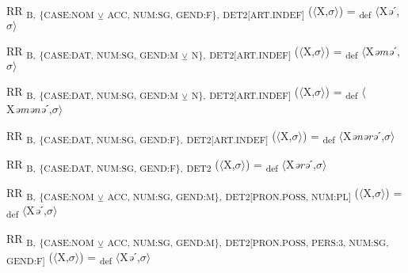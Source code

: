 {\begin{exe}
 RR \textsubscript{B,} \textsubscript{\{CASE:NOM} \textsubscript{${\veebar}$}\textsubscript{ ACC, NUM:SG, GEND:F\},} \textsubscript{DET2[ART.INDEF]} ($\langle$X,$\sigma $$\rangle$) = \textsubscript{def} $\langle$X\textit{ə}ˊ,$\sigma $$\rangle$
\end{exe}

\begin{exe}
 RR \textsubscript{B,} \textsubscript{\{CASE:DAT, NUM:SG, GEND:M} \textsubscript{${\veebar}$}\textsubscript{ N\},} \textsubscript{DET2[ART.INDEF]} ($\langle$X,$\sigma $$\rangle$) = \textsubscript{def} $\langle$X\textit{əmə}ˊ,$\sigma $$\rangle$
\end{exe}

\begin{exe}
 RR \textsubscript{B,} \textsubscript{\{CASE:DAT, NUM:SG, GEND:M} \textsubscript{${\veebar}$}\textsubscript{ N\},} \textsubscript{DET2[ART.INDEF]} ($\langle$X,$\sigma $$\rangle$) = \textsubscript{def} $\langle$X\textit{əmənə}ˊ,$\sigma $$\rangle$
\end{exe}

\begin{exe}
 RR \textsubscript{B,} \textsubscript{\{CASE:DAT, NUM:SG, GEND:F\},} \textsubscript{DET2[ART.INDEF]} ($\langle$X,$\sigma $$\rangle$) = \textsubscript{def} $\langle$X\textit{ənərə}ˊ,$\sigma $$\rangle$
\end{exe}

\begin{exe}
 RR \textsubscript{B,} \textsubscript{\{CASE:DAT, NUM:SG, GEND:F\},} \textsubscript{DET2} ($\langle$X,$\sigma $$\rangle$) = \textsubscript{def} $\langle$X\textit{ərə}ˊ,$\sigma $$\rangle$
\end{exe}

\begin{exe}
 RR \textsubscript{B,} \textsubscript{\{CASE:NOM} \textsubscript{${\veebar}$}\textsubscript{ ACC, NUM:SG, GEND:M\},} \textsubscript{DET2[PRON.POSS, NUM:PL]} ($\langle$X,$\sigma $$\rangle$) = \textsubscript{def} $\langle$X\textit{ə}ˊ,$\sigma $$\rangle$
\end{exe}

\begin{exe}
 RR \textsubscript{B,} \textsubscript{\{CASE:NOM} \textsubscript{${\veebar}$}\textsubscript{ ACC, NUM:SG, GEND:M\},} \textsubscript{DET2[PRON.POSS, PERS:3, NUM:SG, GEND:F]} ($\langle$X,$\sigma $$\rangle$) = \textsubscript{def} $\langle$X\textit{ə}ˊ,$\sigma $$\rangle$
\end{exe}

}
